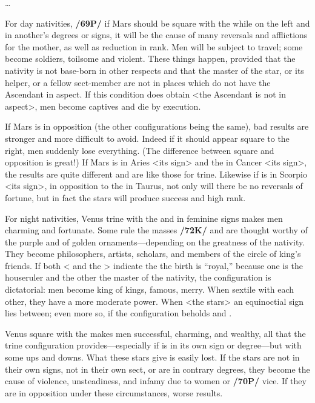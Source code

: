\ldots

For day nativities, \textbf{/69P/} if Mars \marginnote{\Mars \Square \Moon} should be square with the \Moon\xspace while on the left and in another’s degrees or signs, it will be the cause of many reversals and afflictions for the mother, as well as reduction in rank. Men will be subject to travel; some become soldiers, toilsome and violent. These things happen, provided that the nativity is not base-born in other respects and that the master of the star, or its helper, or a fellow sect-member are not in places which do not have the Ascendant in aspect. If this condition does
obtain <the Ascendant is not in aspect>, men become captives and die by execution. 

If Mars is in opposition (the other configurations being the same), bad results are stronger and more difficult to avoid. Indeed if it should appear square to the right, men suddenly lose everything. (The difference between square and opposition is great!) \mndl If Mars is in Aries <its sign> and the \Moon\xspace in Cancer <its sign>, the results are quite different and are like those for trine. Likewise if \Mars\xspace is in Scorpio <its sign>, in opposition to the \Moon\xspace in Taurus, not only will there be no reversals of fortune, but in fact the stars will produce success and high rank.

For night nativities, Venus \marginnote{\Venus \Trine \Moon} trine with the \Moon\xspace and in feminine signs makes men charming and fortunate. Some rule the masses \textbf{/72K/} and are thought worthy of the purple and of golden ornaments—depending on the greatness of the nativity. They become philosophers, artists, scholars, and members of
the circle of king’s friends. If both <\Venus\xspace and the \Moon> indicate the the birth is “royal,” because one is
the houseruler and the other the master of the nativity, the configuration is dictatorial: men become king of kings, famous, merry. When sextile with each other, they have a more moderate power. When <the stars> an equinoctial sign lies between; even more so, if the configuration beholds \Pisces\xspace and \Taurus.

Venus \marginnote{\Venus \Square \Moon} square with the \Moon\xspace makes men successful, charming, and wealthy, all that the trine configuration provides—especially if \Venus\xspace is in its own sign or degree—but with some ups and downs. \mndl What these stars give is easily lost. If the stars are not in their own signs, not in their own sect, or are in contrary degrees, they become the cause of violence, unsteadiness, and infamy due to women or \textbf{/70P/} vice.
If they are in opposition under these circumstances, worse results.

